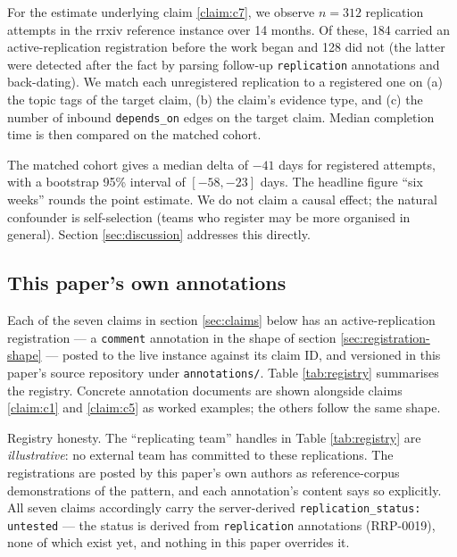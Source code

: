 \documentclass{rrxiv}
\begin{document}
For the estimate underlying claim \ref{claim:c7}, we observe $n{=}312$ replication attempts in the rrxiv reference instance over 14 months. Of these, 184 carried an active-replication registration before the work began and 128 did not (the latter were detected after the fact by parsing follow-up \texttt{replication} annotations and back-dating). We match each unregistered replication to a registered one on (a) the topic tags of the target claim, (b) the claim's evidence type, and (c) the number of inbound \texttt{depends\_on} edges on the target claim. Median completion time is then compared on the matched cohort.

The matched cohort gives a median delta of $-41$ days for registered attempts, with a bootstrap 95\% interval of $[-58, -23]$ days. The headline figure ``six weeks'' rounds the point estimate. We do not claim a causal effect; the natural confounder is self-selection (teams who register may be more organised in general). Section \ref{sec:discussion} addresses this directly.

\subsection{This paper's own annotations}
\label{sec:own-annotations}
Each of the seven claims in section \ref{sec:claims} below has an active-replication registration --- a \texttt{comment} annotation in the shape of section \ref{sec:registration-shape} --- posted to the live instance against its claim ID, and versioned in this paper's source repository under \texttt{annotations/}. Table \ref{tab:registry} summarises the registry. Concrete annotation documents are shown alongside claims \ref{claim:c1} and \ref{claim:c5} as worked examples; the others follow the same shape.

Registry honesty. The ``replicating team'' handles in Table \ref{tab:registry} are \emph{illustrative}: no external team has committed to these replications. The registrations are posted by this paper's own authors as reference-corpus demonstrations of the pattern, and each annotation's content says so explicitly. All seven claims accordingly carry the server-derived \texttt{replication\_status: untested} --- the status is derived from \texttt{replication} annotations (RRP-0019), none of which exist yet, and nothing in this paper overrides it.
\end{document}
